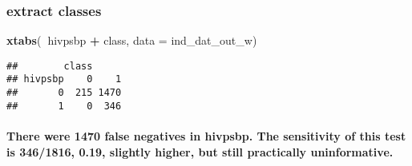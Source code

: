 \documentclass[
]{article}
\newenvironment{Shaded}{\begin{snugshade}}{\end{snugshade}}
\newcommand{\DataTypeTok}[1]{\textcolor[rgb]{0.13,0.29,0.53}{#1}}
\newcommand{\DecValTok}[1]{\textcolor[rgb]{0.00,0.00,0.81}{#1}}
\newcommand{\KeywordTok}[1]{\textcolor[rgb]{0.13,0.29,0.53}{\textbf{#1}}}
\newcommand{\NormalTok}[1]{#1}
\newcommand{\OperatorTok}[1]{\textcolor[rgb]{0.81,0.36,0.00}{\textbf{#1}}}
\newcommand{\OtherTok}[1]{\textcolor[rgb]{0.56,0.35,0.01}{#1}}
\newcommand{\StringTok}[1]{\textcolor[rgb]{0.31,0.60,0.02}{#1}}
\let\oldparagraph\paragraph
\renewcommand{\paragraph}[1]{\oldparagraph{#1}\mbox{}}
\begin{document}
\hypertarget{extract-classes-1}{%
\subsubsection{extract classes}\label{extract-classes-1}}

\begin{Shaded}
\end{Shaded}

\begin{Shaded}
\end{Shaded}

\begin{Shaded}
\begin{Highlighting}[]
\KeywordTok{xtabs}\NormalTok{(}\OperatorTok{~}\NormalTok{hivpsbp }\OperatorTok{+}\StringTok{ }\NormalTok{class, }\DataTypeTok{data =}\NormalTok{ ind_dat_out_w)}
\end{Highlighting}
\end{Shaded}

\begin{verbatim}
##        class
## hivpsbp    0    1
##       0  215 1470
##       1    0  346
\end{verbatim}

\hypertarget{there-were-1470-false-negatives-in-hivpsbp.-the-sensitivity-of-this-test-is-3461816-0.19-slightly-higher-but-still-practically-uninformative.}{%
\paragraph{There were 1470 false negatives in hivpsbp. The sensitivity
of this test is 346/1816, 0.19, slightly higher, but still practically
uninformative.}\label{there-were-1470-false-negatives-in-hivpsbp.-the-sensitivity-of-this-test-is-3461816-0.19-slightly-higher-but-still-practically-uninformative.}}
\end{document}
